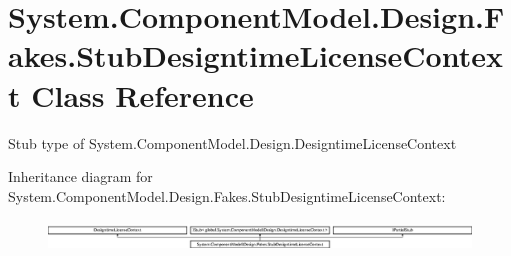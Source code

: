 \hypertarget{class_system_1_1_component_model_1_1_design_1_1_fakes_1_1_stub_designtime_license_context}{\section{System.\-Component\-Model.\-Design.\-Fakes.\-Stub\-Designtime\-License\-Context Class Reference}
\label{class_system_1_1_component_model_1_1_design_1_1_fakes_1_1_stub_designtime_license_context}
}


Stub type of System.\-Component\-Model.\-Design.\-Designtime\-License\-Context 


Inheritance diagram for System.\-Component\-Model.\-Design.\-Fakes.\-Stub\-Designtime\-License\-Context\-:\begin{figure}[H]
\begin{center}
\leavevmode
\includegraphics[height=0.837070cm]{class_system_1_1_component_model_1_1_design_1_1_fakes_1_1_stub_designtime_license_context}
\end{center}
\end{figure}
